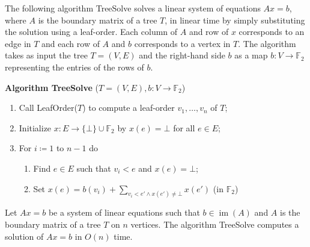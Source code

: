 \documentclass[english,a4paper,nolineno,cleveref]{socg-lipics-v2021}
\DeclareMathOperator{\im}{im}
\begin{document}
The following algorithm {\sc TreeSolve} solves a linear system of equations $Ax=b$, where $A$ is the boundary matrix of a tree $T$, in linear time by simply substituting the solution using a leaf-order. Each column of $A$ and row of $x$ corresponds to an edge in $T$ and each row of $A$ and $b$ corresponds to a vertex in $T$. The algorithm takes as input the tree $T=(V,E)$ and the right-hand side $b$ as a map $b\colon V\rightarrow \mathbb{F}_2$ representing the entries of the rows of $b$.

\vspace{0.1in}
\noindent
{\bf Algorithm {\sc TreeSolve}} ($T=(V,E),b\colon V\rightarrow\mathbb{F}_2$)
\begin{enumerate}
    \item Call {\sc LeafOrder}($T$) to compute a leaf-order $v_1,\ldots,v_n$ of $T$; 
    \item Initialize $x\colon E\rightarrow \{\bot\}\cup\mathbb{F}_2$ by $x(e)=\bot$ for all $e\in E$;
    \item For $i\coloneqq 1$ to $n-1$ do
    \begin{enumerate}
        \item Find $e\in E$ such that $v_i<e$ and $x(e)=\bot$;
        \item Set $x(e)=b(v_i)+\underset{v_i<e'\wedge x(e')\neq \bot}{\sum}x(e')$ (in $\mathbb{F}_2$)
    \end{enumerate}
\end{enumerate}

\begin{theorem} \label{prop:tree_solve}
Let $Ax=b$ be a system of linear equations such that $b\in\im(A)$ and $A$ is the boundary matrix of a tree $T$ on $n$ vertices. The algorithm {\sc TreeSolve} computes a solution of $Ax=b$ in $O(n)$ time.
\end{theorem}
\end{document}
